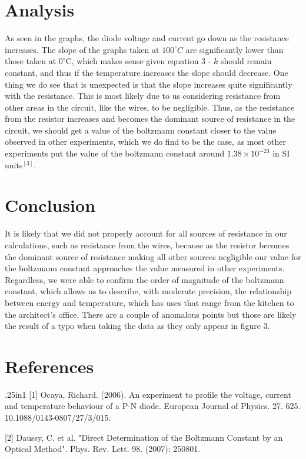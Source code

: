 \documentclass[12pt, a4paper]{article}
\begin{document}
\section{Analysis}
	As seen in the graphs, the diode voltage and current go down as the resistance increases. The slope of the graphs taken at $100^{\circ}C$ are significantly lower than those taken at $0^{\circ}$C, which makes sense given equation 3 - $k$ should remain constant, and thus if the temperature increases the slope should decrease. One thing we do see that is unexpected is that the slope increases quite significantly with the resistance. This is most likely due to us considering resistance from other areas in the circuit, like the wires, to be negligible. Thus, as the resistance from the resistor increases and becomes the dominant source of resistance in the circuit, we should get a value of the boltzmann constant closer to the value observed in other experiments, which we do find to be the case, as most other experiments put the value of the boltzmann constant around $1.38 \times 10^{-23}$ in SI units$^{[3]}$. 

\section{Conclusion}
	It is likely that we did not properly account for all sources of resistance in our calculations, such as resistance from the wires, because as the resistor becomes the dominant source of resistance making all other sources negligible our value for the boltzmann constant approaches the value measured in other experiments. Regardless, we were able to confirm the order of magnitude of the boltzmann constant, which allows us to describe, with moderate precision, the relationship between energy and temperature, which has uses that range from the kitchen to the architect's office. There are a couple of anomalous points but those are likely the result of a typo when taking the data as they only appear in figure 3. 

\section*{References}

	\begin{hangparas}{.25in}{1}
		[1] Ocaya, Richard. (2006). An experiment to profile the voltage, current and temperature behaviour of a P-N diode. European Journal of Physics. 27. 625. 10.1088/0143-0807/27/3/015.
		
		[2] Daussy, C. et al. "Direct Determination of the Boltzmann Constant by an Optical Method". Phys. Rev. Lett. 98. (2007): 250801.
	\end{hangparas}
\end{document}
